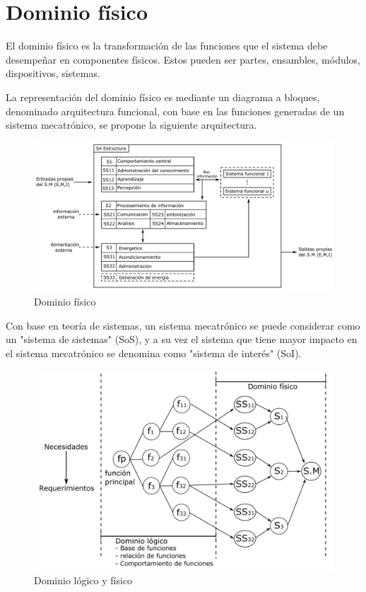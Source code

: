 \section{Dominio físico}
El dominio físico es la transformación de las funciones que el sistema debe desempeñar en componentes físicos. Estos pueden ser partes, ensambles, módulos, dispositivos, sistemas.

La representación del dominio físico es mediante un diagrama a bloques, denominado arquitectura funcional, con base en las funciones generadas de un sistema mecatrónico, se propone la siguiente arquitectura. 

\begin{figure}[h!]
    \centering
        \includegraphics[scale=0.22]{Proyecto Integrador Figuras/22 Dominio fisico.png}
        \caption{Dominio físico}
\end{figure}

Con base en teoría de sistemas, un sistema mecatrónico se puede considerar como un "sistema de sistemas" (SoS), y a su vez el sistema que tiene mayor impacto en el sistema mecatrónico se denomina como "sistema de interés" (SoI).

\begin{figure}[h!]
    \centering
        \includegraphics[scale=0.20]{Proyecto Integrador Figuras/23 Dominio Logico y Fisico.png}
        \caption{Dominio lógico y físico}
\end{figure}